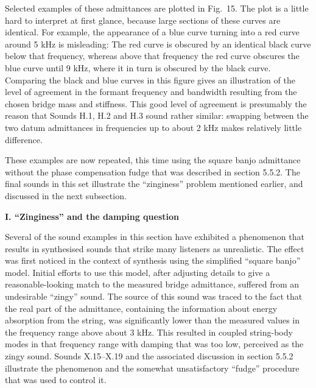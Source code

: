\audio{}

\audio{}

\audio{}

\audio{}

\audio{}

  Selected examples of these admittances are plotted in Fig.\ 15. The plot is 
  a little hard to interpret at first glance, because large sections of these 
  curves are identical. For example, the appearance of a blue curve turning 
  into a red curve around 5 kHz is misleading: The red curve is obscured by an 
  identical black curve below that frequency, whereas above that frequency the 
  red curve obscures the blue curve until 9 kHz, where it in turn is obscured 
  by the black curve. Comparing the black and blue curves in this figure gives 
  an illustration of the level of agreement in the formant frequency and 
  bandwidth resulting from the chosen bridge mass and stiffness. This good 
  level of agreement is presumably the reason that Sounds H.1, H.2 and H.3 
  sound rather similar: swapping between the two datum admittances in 
  frequencies up to about 2 kHz makes relatively little difference. 


  These examples are now repeated, this time using the square banjo admittance 
  without the phase compensation fudge that was described in section 5.5.2. The 
  final sounds in this set illustrate the ``zinginess'' problem mentioned 
  earlier, and discussed in the next subsection. 

\audio{}

\audio{}

\audio{}

\audio{}

\audio{}

  \textbf{I. ``Zinginess'' and the damping question} 

  Several of the sound examples in this section have exhibited a phenomenon 
  that results in synthesised sounds that strike many listeners as unrealistic. 
  The effect was first noticed in the context of synthesis using the simplified 
  ``square banjo'' model. Initial efforts to use this model, after adjusting 
  details to give a reasonable-looking match to the measured bridge admittance, 
  suffered from an undesirable ``zingy'' sound. The source of this sound was 
  traced to the fact that the real part of the admittance, containing the 
  information about energy absorption from the string, was significantly lower 
  than the measured values in the frequency range above about 3 kHz. This 
  resulted in coupled string-body modes in that frequency range with damping 
  that was too low, perceived as the zingy sound. Sounds X.15--X.19 and the 
  associated discussion in section 5.5.2 illustrate the phenomenon and the 
  somewhat unsatisfactory ``fudge'' procedure that was used to control it. 


